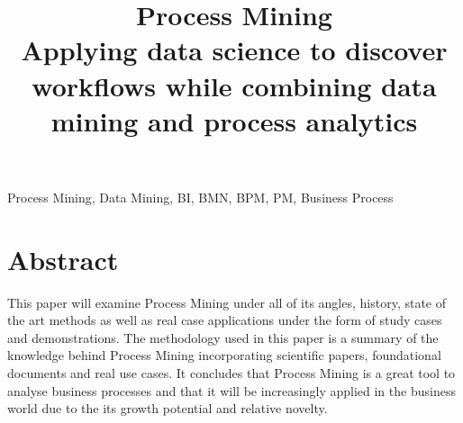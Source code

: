 \documentclass[conference]{IEEEtran}
\begin{document}
\title{Process Mining\\
{\footnotesize Applying data science to discover workflows while combining data mining and process analytics}}

\author{
\and
{}
\and
{}
\and
{}
\and
{}
}

\maketitle

\begin{IEEEkeywords}
Process Mining, Data Mining, BI, BMN, BPM, PM,  Business Process
\end{IEEEkeywords}

\section{Abstract}
This paper will examine Process Mining under all of its angles, history, state of the art methods as well as real case applications under the form of study cases and demonstrations. 
The methodology used in this paper is a summary of the knowledge behind Process Mining incorporating scientific papers, foundational documents and real use cases. 
It concludes that Process Mining is a great tool to analyse business processes and that it will be increasingly applied in the business world due to the its growth potential and relative novelty.
\end{document}
